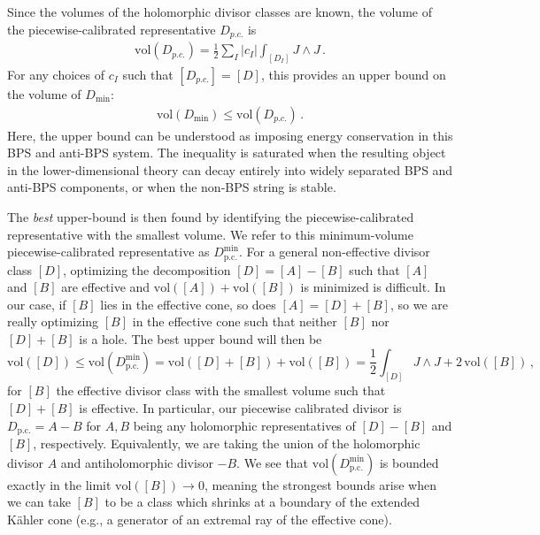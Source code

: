 \documentclass[11pt,dvipsnames]{article}
\theoremstyle{definition}
\begin{document}
Since the volumes of the holomorphic divisor classes are known, the volume of the piecewise-calibrated representative $D_{p.c.}$ is
\begin{align}
    \text{vol}(D_{p.c.}) = \frac{1}{2}\sum_{I} |c_I| \int_{[D_I]} J \wedge J\,.
\end{align}
For any choices of $c_I$ such that $[D_{p.c.}] = [D]$, this provides an upper bound on the volume of $D_{\text{min}}$:
\begin{align}
    \text{vol}(D_{\text{min}}) \leq \text{vol}(D_{p.c.})\,.
\end{align}
Here, the upper bound can be understood as imposing energy conservation in this BPS and anti-BPS system. The inequality is saturated when the resulting object in the lower-dimensional theory can decay entirely into widely separated BPS and anti-BPS components, or when the non-BPS string is stable.

The \textit{best} upper-bound is then found by identifying the piecewise-calibrated representative with the smallest volume. We refer to this minimum-volume piecewise-calibrated representative as $D_{\text{p.c.}}^{\text{min}}$. For a general non-effective divisor class $[D]$, optimizing the decomposition $[D] = [A] - [B]$ such that $[A]$ and $[B]$ are effective and $\text{vol}([A]) + \text{vol}([B])$ is minimized is difficult. In our case, if $[B]$ lies in the effective cone, so does $[A] = [D] + [B]$, so we are really optimizing $[B]$ in the effective cone such that neither $[B]$ nor $[D] + [B]$ is a hole. The best upper bound will then be
\begin{equation}
    \label{eq:upper_bound_theory}
    \text{vol}([D]) \leq \text{vol}(D_{\text{p.c.}}^{\text{min}}) = \text{vol}([D] + [B]) + \text{vol}([B]) = \frac{1}{2} \int_{[D]} J \wedge J + 2 \, \text{vol}([B])\,,
\end{equation}
for $[B]$ the effective divisor class with the smallest volume such that $[D] + [B]$ is effective. In particular, our piecewise calibrated divisor is $D_{\text{p.c.}} = A - B$ for $A, B$ being any holomorphic representatives of $[D] - [B]$ and $[B]$, respectively. Equivalently, we are taking the union of the holomorphic divisor $A$ and antiholomorphic divisor $-B$. We see that $\text{vol}(D_{\text{p.c.}}^{\text{min}})$ is bounded exactly in the limit $\text{vol}([B]) \to 0$, meaning the strongest bounds arise when we can take $[B]$ to be a class which shrinks at a boundary of the extended K\"ahler cone (e.g., a generator of an extremal ray of the effective cone).
\end{document}
